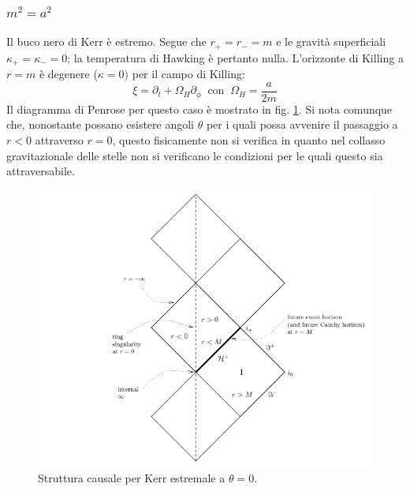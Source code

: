 \subsubsection{$m^2 = a^2$}
Il buco nero di Kerr è estremo. Segue che $r_+=r_-= m$ e le gravità superficiali $\kappa_+ = \kappa_- = 0$; la temperatura di Hawking è pertanto nulla. L'orizzonte di Killing a $r = m$ è degenere ($\kappa =0)$ per il campo di Killing:
\begin{equation*}
    \xi = \partial_t + \Omega_H \partial_\phi \ \textrm{ con } \ \Omega_H = \frac{a}{2m}
\end{equation*}
Il diagramma di Penrose per questo caso è mostrato in fig. \ref{fig.kerr_causale_3}.
Si nota comunque che, nonostante possano esistere angoli $\theta$ per i quali possa avvenire il passaggio a $r<0$ attraverso $r=0$, questo fisicamente non si verifica in quanto nel collasso gravitazionale delle stelle non si verificano le condizioni per le quali questo  sia attraversabile.
\begin{figure}
    \centering
    \includegraphics[scale=0.6]{immagini/kerr_causale_3.png}
    \caption{Struttura causale per Kerr estremale a $\theta =0$.}
    \label{fig.kerr_causale_3}
\end{figure}

